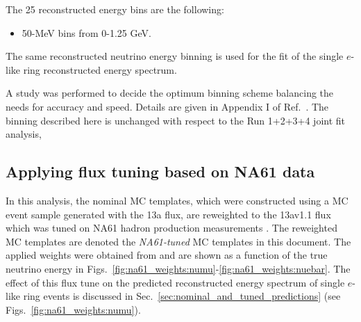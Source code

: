 The 25 reconstructed energy bins are the following:
\begin{itemize}
 \item   50-MeV bins from 0-1.25 GeV.
\end{itemize}
The same reconstructed neutrino energy binning is used for the fit of the single $e$-like ring reconstructed energy spectrum.

A study was performed to decide the optimum binning scheme balancing the needs for accuracy and speed.
Details are given in Appendix I of Ref.\ \cite{OurRun123DisappAnalysis3Flavour}. 
The binning described here is unchanged with respect to the Run 1+2+3+4 joint fit analysis,

\subsection {Applying flux tuning based on NA61 data}
\label{sec:na61_weights}

In this analysis, the nominal MC templates, which were constructed using a MC event sample generated with the 13a flux,
are reweighted to the 13av1.1 flux which was tuned on NA61 hadron production measurements \cite{FluxTuning13a}\cite{NA61T2K2014}.
The reweighted MC templates are denoted the {\em NA61-tuned} MC templates in this document.
The applied weights were obtained from \cite{FluxTuning13a} and are shown as a function of the true neutrino energy 
in Figs.~\ref{fig:na61_weights:numu}-\ref{fig:na61_weights:nuebar}.
The effect of this flux tune on the predicted reconstructed energy spectrum of 
single $e$-like ring events is discussed in Sec.~\ref{sec:nominal_and_tuned_predictions} 
(see Figs.~\ref{fig:na61_weights:numu}).

